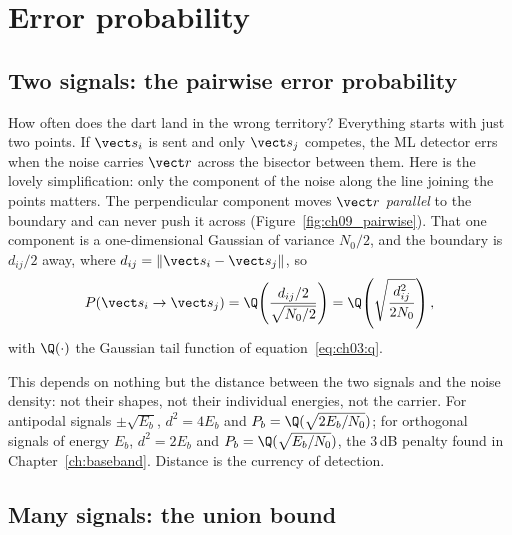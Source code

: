 \section{Error probability}
\label{sec:ch09:errorprob}

\subsection{Two signals: the pairwise error probability}

How often does the dart land in the wrong territory? Everything starts with just two points. If
$\vect s_i$ is sent and only $\vect s_j$ competes, the ML detector errs when the noise carries
$\vect r$ across the bisector between them. Here is the lovely simplification: only the component
of the noise along the line joining the points matters. The perpendicular component moves
$\vect r$ \emph{parallel} to the boundary and can never push it across
(Figure~\ref{fig:ch09_pairwise}). That one component is a one-dimensional Gaussian of variance
$N_0/2$, and the boundary is $d_{ij}/2$ away, where $d_{ij}=\|\vect s_i-\vect s_j\|$, so
\begin{equation}
P(\vect s_i\to\vect s_j)=\Q\!\left(\frac{d_{ij}/2}{\sqrt{N_0/2}}\right)=\Q\!\left(\sqrt{\frac{d_{ij}^2}{2N_0}}\right),
\label{eq:ch09:pairwise}
\end{equation}
with $\Q(\cdot)$ the Gaussian tail function of equation~\eqref{eq:ch03:q}.


This  depends on nothing but the distance between the two
signals and the noise density: not their shapes, not their individual energies, not the carrier.
For antipodal signals $\pm\sqrt{E_b}$, $d^2=4E_b$ and $P_b=\Q(\sqrt{2E_b/N_0})$; for orthogonal
signals of energy $E_b$, $d^2=2E_b$ and $P_b=\Q(\sqrt{E_b/N_0})$, the 3\,dB penalty found in
Chapter~\ref{ch:baseband}. Distance is the currency of detection.

\subsection{Many signals: the union bound}


